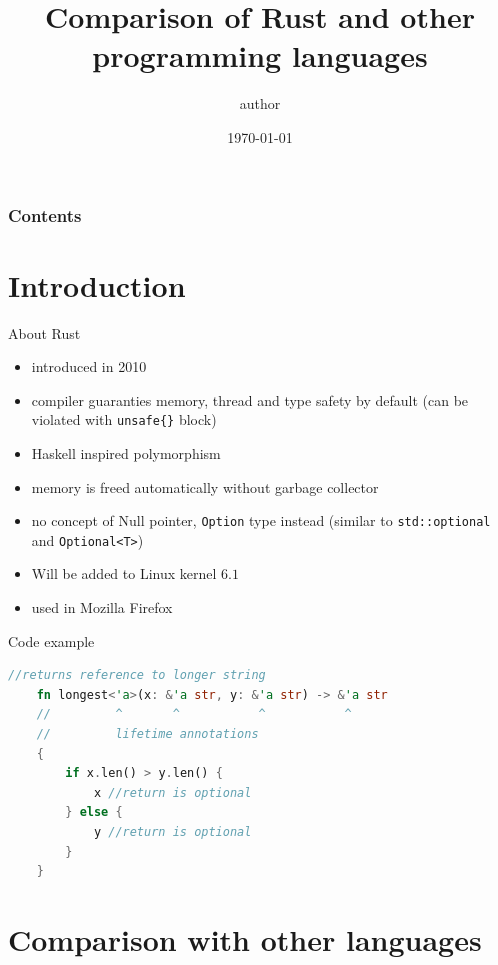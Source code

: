 \documentclass[10pt]{beamer}
\title[Barclays]{Comparison of Rust and other programming languages}
\author[author]{author}
\institute[Barclays]{department?}
\date[\textcolor{white}{\today} ]
{\today}
\begin{document}
\frame{\titlepage}

\begin{frame}
\frametitle{Contents}
\tableofcontents

\end{frame}

\section{Introduction}
    \begin{frame}{About Rust}
	    \begin{itemize}
	        \item introduced in 2010
	        \item compiler guaranties memory, thread and type safety by default (can be violated with \texttt{unsafe\{\}} block)
	        \item Haskell inspired polymorphism
	        \item memory is freed automatically without garbage collector 
	        \item no concept of Null pointer, \texttt{Option} type instead (similar to \texttt{std::optional} and \texttt{Optional<T>})
	        \item Will be added to Linux kernel $6.1$
	        \item used in Mozilla Firefox
	    \end{itemize}
	    
	
    \end{frame}
    
    \begin{frame}[fragile]{Code example}
        \begin{lstlisting}[language=rust, caption={Example program from The Rust Programming Language}]
    //returns reference to longer string
    fn longest<'a>(x: &'a str, y: &'a str) -> &'a str
    //         ^       ^           ^           ^
    //         lifetime annotations
    {
        if x.len() > y.len() {
            x //return is optional
        } else {
            y //return is optional
        }
    }
        \end{lstlisting}
    \end{frame}

\section{Comparison with other languages}
\end{document}
